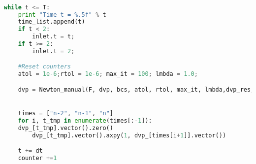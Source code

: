 \begin{lstlisting}[language=Python]

while t <= T:
    print "Time t = %.5f" % t
    time_list.append(t)
    if t < 2:
        inlet.t = t;
    if t >= 2:
        inlet.t = 2;

    #Reset counters
    atol = 1e-6;rtol = 1e-6; max_it = 100; lmbda = 1.0;

    dvp = Newton_manual(F, dvp, bcs, atol, rtol, max_it, lmbda,dvp_res,VVQ)


    times = ["n-2", "n-1", "n"]
    for i, t_tmp in enumerate(times[:-1]):
   	dvp_[t_tmp].vector().zero()
    	dvp_[t_tmp].vector().axpy(1, dvp_[times[i+1]].vector())

    t += dt
    counter +=1
\end{lstlisting}


	









